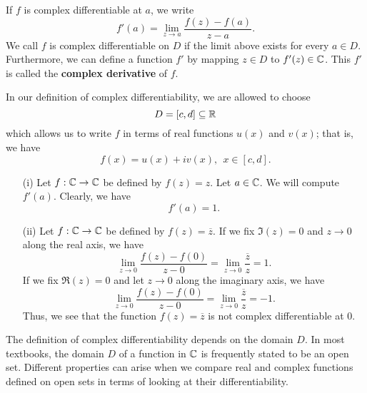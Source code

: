 \documentclass[a4paper]{report}
\begin{document}
If \( f  \) is complex differentiable at \( a  \), we write
\[  f'(a) = \lim_{ z \to a }  \frac{ f(z) - f(a) }{  z - a  }. \]
We call \( f  \) is complex differentiable on \( D  \) if the limit above exists for every \( a \in D  \). Furthermore, we can define a function \( f'  \) by mapping \( z \in D  \) to \( f'(z) \in \mathbb{C}  \). This \( f'  \) is called the \textbf{complex derivative} of \( f  \).  

In our definition of complex differentiability, we are allowed to choose 
\[  D = [c,d] \subseteq  \mathbb{R}  \]
which allows us to write \( f \) in terms of real functions \( u(x) \) and \( v(x) \); that is, we have
\[  f(x) = u(x) + i v(x) , \ \ x \in [c,d]. \]

\begin{eg}
    \begin{enumerate}
        \item[(i)] Let \( f: \mathbb{C} \to \mathbb{C}  \) be defined by \( f(z) = z  \). Let \( a \in \mathbb{C}  \). We will compute \( f'(a)   \). Clearly, we have
            \[  f'(a) = 1.  \]
        \item[(ii)] Let \( f: \mathbb{C} \to \mathbb{C}  \) be defined by \( f(z) = \overline{z} \). If we fix \( \Im(z) = 0  \) and \( z \to 0  \) along the real axis, we have  
            \[  \lim_{ z \to 0 }  \frac{ f(z) - f(0) }{  z -  0  }  = \lim_{ z \to 0 }  \frac{ \overline{z} }{ z } = 1. \]
            If we fix \( \Re(z) = 0  \) and let \( z \to 0  \) along the imaginary axis, we have
            \[  \lim_{ z \to 0 }  \frac{ f(z) - f(0) }{ z - 0  }  = \lim_{ z \to 0 }  \frac{ \overline{z} }{ z }  = -1. \]
            Thus, we see that the function \( f(z) = \overline{z} \) is not complex differentiable at \( 0  \).
    \end{enumerate}
\end{eg}

\begin{remark}
    The definition of complex differentiability depends on the domain \( D  \). In most textbooks, the domain \( D  \) of a function in \( \mathbb{C}  \) is frequently stated to be an open set. Different properties can arise when we compare real and complex functions defined on open sets in terms of looking at their differentiability.
\end{remark}
\end{document}
